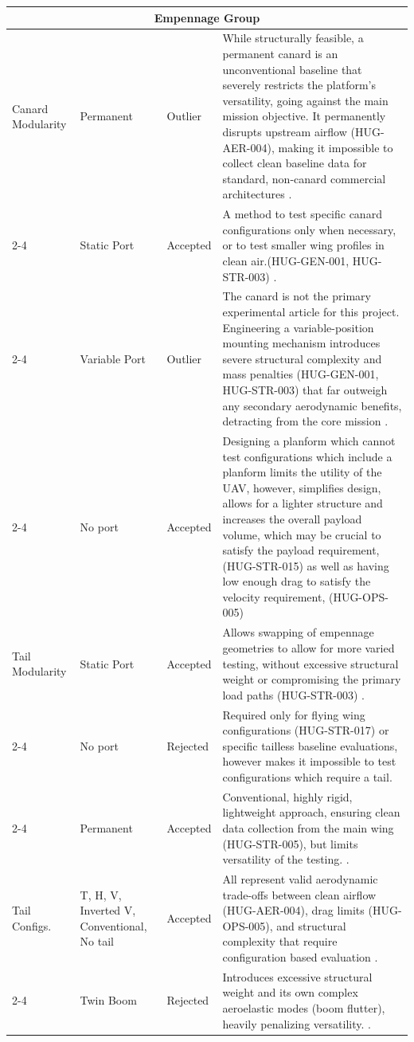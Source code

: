 \begin{longtable}{|p{1.6cm}|p{2.3cm}|p{1.6cm}|p{9.5cm}|}
\multicolumn{4}{|c|}{\textbf{Empennage Group}} \\
\hline
Canard Modularity & Permanent & Outlier & While structurally feasible, a permanent canard is an unconventional baseline that severely restricts the platform's versatility, going against the main mission objective. It permanently disrupts upstream airflow (HUG-AER-004), making it impossible to collect clean baseline data for standard, non-canard commercial architectures \cite{raymer1992aircraft, lopes2005canard}. \\
\cline{2-4}
\multicolumn{1}{|l|}{} & Static Port & Accepted & A method to test specific canard configurations only when necessary, or to test smaller wing profiles in clean air.(HUG-GEN-001, HUG-STR-003) \cite{lopes2005canard}. \\
\cline{2-4}
\multicolumn{1}{|l|}{} & Variable Port & Outlier & The canard is not the primary experimental article for this project. Engineering a variable-position mounting mechanism introduces severe structural complexity and mass penalties (HUG-GEN-001, HUG-STR-003) that far outweigh any secondary aerodynamic benefits, detracting from the core mission \cite{raymer1992aircraft}. \\
\cline{2-4}
\multicolumn{1}{|l|}{} & No port & Accepted & Designing a planform which cannot test configurations which include a planform limits the utility of the UAV, however, simplifies design, allows for a lighter structure and increases the overall payload volume, which may be crucial to satisfy the payload requirement, (HUG-STR-015) as well as having low enough drag to satisfy the velocity requirement, (HUG-OPS-005)  \\
\hline
Tail Modularity & Static Port & Accepted & Allows swapping of empennage geometries to allow for more varied testing, without excessive structural weight or compromising the primary load paths (HUG-STR-003) \cite{Vos}. \\
\cline{2-4}
\multicolumn{1}{|l|}{} & No port & Rejected & Required only for flying wing configurations (HUG-STR-017) or specific tailless baseline evaluations, however makes it impossible to test configurations which require a tail. \\
\cline{2-4}
\multicolumn{1}{|l|}{} & Permanent & Accepted & Conventional, highly rigid, lightweight approach, ensuring clean data collection from the main wing (HUG-STR-005), but limits versatility of the testing. \cite{livne}. \\
\hline
Tail Configs. & T, H, V, Inverted V, Conventional, No tail & Accepted & All represent valid aerodynamic trade-offs between clean airflow (HUG-AER-004), drag limits (HUG-OPS-005), and structural complexity that require configuration based evaluation \cite{Vos, raymer1992aircraft}. \\
\cline{2-4}
\multicolumn{1}{|l|}{} & Twin Boom & Rejected & Introduces excessive structural weight and its own complex aeroelastic modes (boom flutter), heavily penalizing versatility. \cite{raymer1992aircraft}. \\
\hline


\end{longtable}
